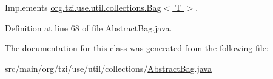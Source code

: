Implements \hyperlink{interfaceorg_1_1tzi_1_1use_1_1util_1_1collections_1_1_bag_3_01_t_01_4_a5f19ae56efa086e66348001fc10c6c45}{org.\-tzi.\-use.\-util.\-collections.\-Bag$<$ T $>$}.



Definition at line 68 of file Abstract\-Bag.\-java.



The documentation for this class was generated from the following file\-:\begin{DoxyCompactItemize}
\item 
src/main/org/tzi/use/util/collections/\hyperlink{_abstract_bag_8java}{Abstract\-Bag.\-java}\end{DoxyCompactItemize}
